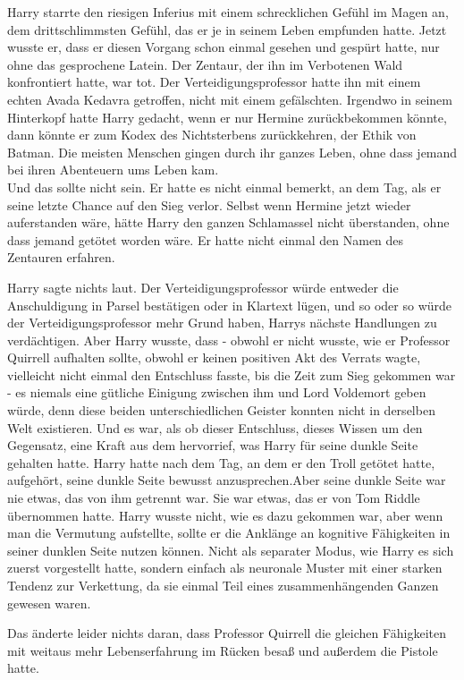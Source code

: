 {Harry starrte den riesigen Inferius mit einem schrecklichen Gefühl im Magen an, dem drittschlimmsten Gefühl, das er je in seinem Leben empfunden hatte. Jetzt wusste er, dass er diesen Vorgang schon einmal gesehen und gespürt hatte, nur ohne das gesprochene Latein. Der Zentaur, der ihn im Verbotenen Wald konfrontiert hatte, war tot. Der Verteidigungsprofessor hatte ihn mit einem echten Avada Kedavra getroffen, nicht mit einem gefälschten. Irgendwo in seinem Hinterkopf hatte Harry gedacht, wenn er nur Hermine zurückbekommen könnte, dann könnte er zum Kodex des Nichtsterbens zurückkehren, der Ethik von Batman. Die meisten Menschen gingen durch ihr ganzes Leben, ohne dass jemand bei ihren Abenteuern ums Leben kam.\\ Und das sollte nicht sein. Er hatte es nicht einmal bemerkt, an dem Tag, als er seine letzte Chance auf den Sieg verlor. Selbst wenn Hermine jetzt wieder auferstanden wäre, hätte Harry den ganzen Schlamassel nicht überstanden, ohne dass jemand getötet worden wäre. Er hatte nicht einmal den Namen des Zentauren erfahren.

Harry sagte nichts laut. Der Verteidigungsprofessor würde entweder die Anschuldigung in Parsel bestätigen oder in Klartext lügen, und so oder so würde der Verteidigungsprofessor mehr Grund haben, Harrys nächste Handlungen zu verdächtigen. Aber Harry wusste, dass - obwohl er nicht wusste, wie er Professor Quirrell aufhalten sollte, obwohl er keinen positiven Akt des Verrats wagte, vielleicht nicht einmal den Entschluss fasste, bis die Zeit zum Sieg gekommen war - es niemals eine gütliche Einigung zwischen ihm und Lord Voldemort geben würde, denn diese beiden unterschiedlichen Geister konnten nicht in derselben Welt existieren. Und es war, als ob dieser Entschluss, dieses Wissen um den Gegensatz, eine Kraft aus dem hervorrief, was Harry für seine dunkle Seite gehalten hatte. Harry hatte nach dem Tag, an dem er den Troll getötet hatte, aufgehört, seine dunkle Seite bewusst anzusprechen.Aber seine dunkle Seite war nie etwas, das von ihm getrennt war. Sie war etwas, das er von Tom Riddle übernommen hatte. Harry wusste nicht, wie es dazu gekommen war, aber wenn man die Vermutung aufstellte, sollte er die Anklänge an kognitive Fähigkeiten in seiner dunklen Seite nutzen können. Nicht als separater Modus, wie Harry es sich zuerst vorgestellt hatte, sondern einfach als neuronale Muster mit einer starken Tendenz zur Verkettung, da sie einmal Teil eines zusammenhängenden Ganzen gewesen waren.

Das änderte leider nichts daran, dass Professor Quirrell die gleichen Fähigkeiten mit weitaus mehr Lebenserfahrung im Rücken besaß und außerdem die Pistole hatte.

}
